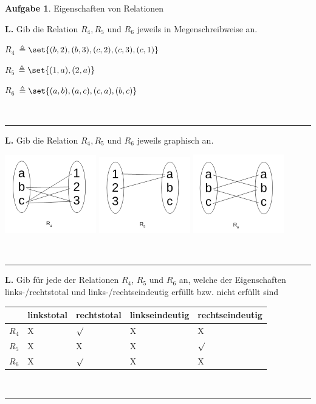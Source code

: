 \documentclass[10pt,leqno ]{article}
\DeclarePairedDelimiter\set\{\}
\theoremstyle{definition}
\newtheorem{problem}[theorem]{Aufgabe}
\newenvironment{solution}[1][L]{\begin{doublespace}\textbf{#1.}\quad }{\ \rule{0.5em}{0.5em}\end{doublespace}}
\begin{document}
\pagebreak

\begin{problem}
    Eigenschaften von Relationen
\end{problem}

\begin{solution}
   Gib die Relation \(R_4, R_5\) und \(R_6\) jeweils in Megenschreibweise an.
   
   $R_4$ \( \triangleq \set{ (b,2),(b,3),(c,2),(c,3),(c,1)} \)
   
   $R_5$ \( \triangleq \set{ (1,a),(2,a)} \)
   
   $R_6$ \( \triangleq \set{ (a,b),(a,c),(c,a),(b,c)} \)
   
   
\end{solution}
\begin{solution}
   Gib die Relation \(R_4, R_5\) und \(R_6\) jeweils graphisch an.
   
\includegraphics{abb/R4}
\includegraphics{abb/R5}
\includegraphics{abb/R6}

\end{solution}
\begin{solution}
   Gib für jede der Relationen \(R_4\), \(R_5\) und \(R_6\) an, welche der Eigenschaften links-/rechtstotal
   und links-/rechtseindeutig erfüllt bzw. nicht erfüllt sind
   
   \begin{tabular}{|p{1cm}|p{3cm}|p{3cm}|p{3cm}|p{3cm}|}
     \hline

        & linkstotal & rechtstotal& linkseindeutig& rechtseindeutig\\    
        
     \hline
       $R_4$  & X &  \(\surd \) & X & X  \\
     \hline
       $R_5$ & X  & X & X&  \(\surd \) \\
     \hline
       $R_6$ & X &  \(\surd \) & X & X \\
     \hline
   \end{tabular}
   
\end{solution}
\end{document}
